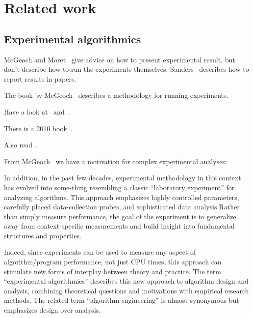 \documentclass{llncs}
\begin{document}
\section{Related work}

\subsection{Experimental algorithmics}

McGeoch and Moret~\cite{DBLP:journals/sigact/McGeochM99} give advice on how
to present experimental result, but don't describe how to run the experiments
themselves.
Sanders~\cite{DBLP:conf/dagstuhl/Sanders00} describes how to report results
in papers.

The book by McGeoch~\cite{DBLP:reference/algo/McGeoch08} describes a methodology
for running experiments.

Have a look at~\cite{DBLP:journals/jucs/MoretS01} and~\cite{DBLP:conf/dimacs/Moret99}.

There is a 2010 book~\cite{DBLP:books/sp/2010BCPP}.

Also read~\cite{DBLP:series/ncs/Bartz-BeielsteinP14}.

From McGeoch~\cite{DBLP:journals/cacm/McGeoch07} we have a motivation for complex
experimental analyses:
\begin{center}
\begin{minipage}{0.8\textwidth}
  In addition, in the past few decades, experimental methodology in this
  context has evolved into some-thing resembling a classic “laboratory
  experiment” for analyzing algorithms. This approach emphasizes highly
  controlled parameters, carefully placed data-collection probes, and
  sophisticated data analysis.Rather than simply measure performance, the
  goal of the experiment is to generalize away from context-specific
  measurements and build insight into fundamental structures and properties.

  Indeed, since experiments can be used to measure any aspect of
  algorithm/program performance, not just CPU times, this approach can
  stimulate new forms of interplay between theory and practice. The term
  “experimental algorithmics” describes this new approach to algorithm design
  and analysis, combining theoretical questions and motivations with
  empirical research methods. The related term “algorithm engineering” is
  almost synonymous but emphasizes design over analysis.
\end{minipage}
\end{center}
\end{document}
